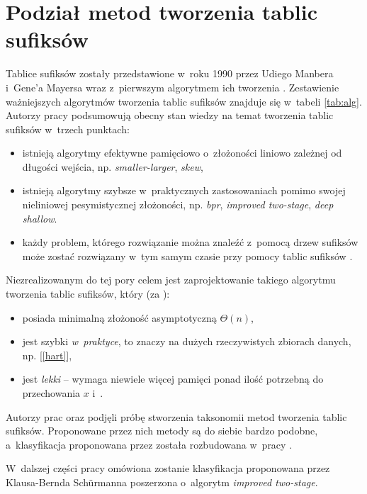 \chapter{Podział metod tworzenia tablic sufiksów}

Tablice sufiksów zostały przedstawione w~roku 1990 przez Udiego Manbera i~Gene'a
Mayersa wraz z~pierwszym algorytmem ich tworzenia \cite{Manber90}.
Zestawienie ważniejszych algorytmów tworzenia tablic sufiksów
znajduje się w~tabeli \ref{tab:alg}. Autorzy pracy \cite{taxonomy} podsumowują
obecny stan wiedzy na temat tworzenia tablic sufiksów w~trzech punktach:
\begin{itemize}
  \item istnieją algorytmy efektywne pamięciowo o~złożoności liniowo zależnej
  od długości wejścia, np. \emph{smaller-larger}, \emph{skew},
  \item istnieją algorytmy szybsze w~praktycznych zastosowaniach pomimo swojej
  nieliniowej pesymistycznej złożoności, np. \emph{bpr}, \emph{improved  two-stage}, \emph{deep shallow}.
  \item każdy problem, którego rozwiązanie można znaleźć z~pomocą drzew sufiksów
  może zostać rozwiązany w~tym samym czasie przy pomocy tablic sufiksów
  \cite{replacing}.
\end{itemize}

\noindent
Niezrealizowanym do tej pory celem jest zaprojektowanie takiego algorytmu
tworzenia tablic sufiksów, który (za \cite{taxonomy}):
\begin{itemize}
  \item posiada minimalną złożoność asymptotyczną $\Theta(n)$,
  \item  jest szybki \emph{w~praktyce}, to znaczy na dużych rzeczywistych
  zbiorach danych, np. [\ref{hart}],
  \item jest \emph{lekki} -- wymaga niewiele więcej pamięci ponad ilość
  potrzebną do przechowania $x$ i~.
\end{itemize}


\noindent 
Autorzy prac \cite{taxonomy} oraz \cite{schurmann-phd} podjęli próbę stworzenia taksonomii
metod tworzenia tablic sufiksów. Proponowane przez nich metody są do siebie bardzo podobne,
a~klasyfikacja proponowana przez \cite{taxonomy} została rozbudowana w~pracy \cite{schurmann-phd}.
  
W~dalszej części pracy omówiona zostanie klasyfikacja proponowana przez Klausa-Bernda Schürmanna
\cite{schurmann-phd} poszerzona o~algorytm \emph{improved two-stage}.

